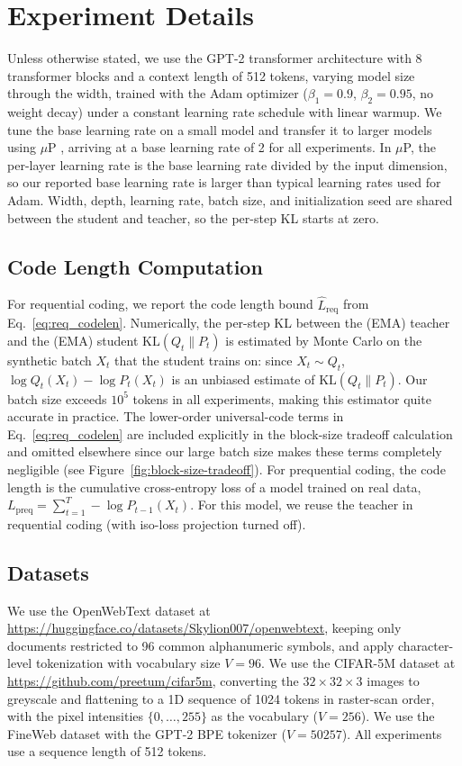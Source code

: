 \documentclass{article}
\theoremstyle{plain}
\theoremstyle{definition}
\theoremstyle{remark}
\begin{document}
%
\section{Experiment Details}
\label{app:experiment}

Unless otherwise stated, we use the GPT-2 \citep{radford2019language} transformer architecture with 8 transformer blocks and a context length of 512 tokens, varying model size through the width, trained with the Adam optimizer ($\beta_1{=}0.9$, $\beta_2{=}0.95$, no weight decay) under a constant learning rate schedule with linear warmup. We tune the base learning rate on a small model and transfer it to larger models using $\mu$P \citep{yang2022tensor}, arriving at a base learning rate of 2 for all experiments. In $\mu$P, the per-layer learning rate is the base learning rate divided by the input dimension, so our reported base learning rate is larger than typical learning rates used for Adam. Width, depth, learning rate, batch size, and initialization seed are shared between the student and teacher, so the per-step KL starts at zero.


\subsection{Code Length Computation}\label{app:codelen}
For requential coding, we report the code length bound $\widehat L_\mathrm{req}$ from Eq.~\eqref{eq:req_codelen}. Numerically, the per-step KL between the (EMA) teacher and the (EMA) student $\mathrm{KL}(Q_t\|P_t)$ is estimated by Monte Carlo on the synthetic batch $X_t$ that the student trains on: since $X_t \sim Q_t$, $\log Q_t(X_t)-\log P_t(X_t)$ is an unbiased estimate of $\mathrm{KL}(Q_t\|P_t)$. Our batch size exceeds $10^5$ tokens in all experiments, making this estimator quite accurate in practice. The lower-order universal-code terms in Eq.~\eqref{eq:req_codelen} are included explicitly in the block-size tradeoff calculation and omitted elsewhere since our large batch size makes these terms completely negligible (see Figure~\ref{fig:block-size-tradeoff}). For prequential coding, the code length is the cumulative cross-entropy loss of a model trained on real data, $L_{\mathrm{preq}} = \sum_{t=1}^{T} -\log P_{t-1}(X_t).$ For this model, we reuse the teacher in requential coding (with iso-loss projection turned off).


\subsection{Datasets}\label{app:owt}\label{app:c5m}
We use the OpenWebText dataset at \url{https://huggingface.co/datasets/Skylion007/openwebtext}, keeping only documents restricted to 96 common alphanumeric symbols, and apply character-level tokenization with vocabulary size $V = 96$. We use the CIFAR-5M dataset \citep{nakkiran2020deep} at \url{https://github.com/preetum/cifar5m}, converting the $32 \times 32 \times 3$ images to greyscale and flattening to a 1D sequence of 1024 tokens in raster-scan order, with the pixel intensities $\{0,\ldots,255\}$ as the vocabulary ($V = 256$). We use the FineWeb dataset \citep{penedo2024fineweb} with the GPT-2 BPE tokenizer ($V = 50257$). All experiments use a sequence length of 512 tokens.
\end{document}
